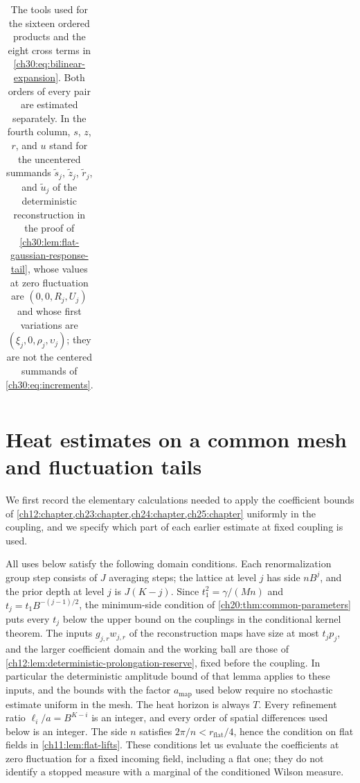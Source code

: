 \begin{table}[ht]
\begin{tabular}{p{0.15\linewidth}p{0.235\linewidth}p{0.265\linewidth}p{0.235\linewidth}}
\bottomrule
\end{tabular}
\caption{The tools used for the sixteen ordered products and the eight cross terms in \eqref{ch30:eq:bilinear-expansion}. Both orders of every pair are estimated separately. In the fourth column, $s$, $z$, $r$, and $u$ stand for the uncentered summands $\tilde s_j$, $\tilde z_j$, $\tilde r_j$, and $\tilde u_j$ of the deterministic reconstruction in the proof of \cref{ch30:lem:flat-gaussian-response-tail}, whose values at zero fluctuation are $(0,0,R_j,U_j)$ and whose first variations are $(\xi_j,0,\rho_j,\upsilon_j)$; they are not the centered summands of \eqref{ch30:eq:increments}.}
\label{ch30:tab:products}
\end{table}

\section{Heat estimates on a common mesh and fluctuation tails}\label{ch30:sec:calculus}

We first record the elementary calculations needed to apply the coefficient bounds of \cref{ch12:chapter,ch23:chapter,ch24:chapter,ch25:chapter} uniformly in the coupling, and we specify which part of each earlier estimate at fixed coupling is used.

All uses below satisfy the following domain conditions. Each renormalization group step consists of $J$ averaging steps; the lattice at level $j$ has side $nB^j$, and the prior depth at level $j$ is $J(K-j)$. Since $t_1^2=\gamma/(Mn)$ and $t_j=t_1B^{-(j-1)/2}$, the minimum-side condition of \cref{ch20:thm:common-parameters} puts every $t_j$ below the upper bound on the couplings in the conditional kernel theorem. The inputs $g_{j,r}w_{j,r}$ of the reconstruction maps have size at most $t_jp_j$, and the larger coefficient domain and the working ball are those of \cref{ch12:lem:deterministic-prolongation-reserve}, fixed before the coupling. In particular the deterministic amplitude bound of that lemma applies to these inputs, and the bounds with the factor $a_{\mathrm{map}}$ used below require no stochastic estimate uniform in the mesh. The heat horizon is always $T$. Every refinement ratio $\ell_i/a=B^{K-i}$ is an integer, and every order of spatial differences used below is an integer. The side $n$ satisfies $2\pi/n<r_{\mathrm{flat}}/4$, hence the condition on flat fields in \cref{ch11:lem:flat-lifts}. These conditions let us evaluate the coefficients at zero fluctuation for a fixed incoming field, including a flat one; they do not identify a stopped measure with a marginal of the conditioned Wilson measure.

